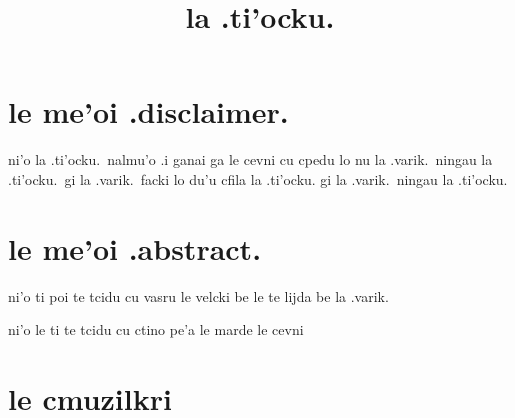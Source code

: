 \documentclass{report}
\title{la .ti'ocku.}
\begin{document}
\maketitle

\chapter{le me'oi .disclaimer.}
ni'o la .ti'ocku.\ nalmu'o  .i ganai ga le cevni cu cpedu lo nu la .varik.\ ningau la .ti'ocku.\ gi la .varik.\ facki lo du'u cfila la .ti'ocku. gi la .varik.\ ningau la .ti'ocku.

\chapter{le me'oi .abstract.}
ni'o ti poi te tcidu cu vasru le velcki be le te lijda be la .varik.

ni'o le ti te tcidu cu ctino pe'a le marde le cevni

\chapter{le cmuzilkri}
\end{document}
